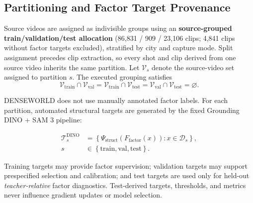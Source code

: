 \subsection{Partitioning and Factor Target Provenance}
\label{app:dataset_splits}

Source videos are assigned as indivisible groups using an
\textbf{source-grouped train/validation/test allocation} (86,831 / 909 / 23,106 clips; 4,841 clips without factor targets excluded), stratified by
city and capture mode. Split assignment precedes clip extraction, so
every shot and clip derived from one source video inherits the same
partition. Let \(\mathcal V_s\) denote the source-video set assigned to
partition \(s\). The executed grouping satisfies
\begin{equation*}
\mathcal V_{\mathrm{train}}\cap\mathcal V_{\mathrm{val}}
=
\mathcal V_{\mathrm{train}}\cap\mathcal V_{\mathrm{test}}
=
\mathcal V_{\mathrm{val}}\cap\mathcal V_{\mathrm{test}}
=
\varnothing.
\end{equation*}

DENSEWORLD does not use manually annotated factor labels. For each
partition, automated structural targets are generated by the fixed
Grounding DINO + SAM 3 pipeline:

\begin{equation*}
\begin{aligned}
\mathcal T_s^{\mathrm{DINO}}
&=
\left\{
\Psi_{\mathrm{struct}}
\!\left(
F_{\mathrm{factor}}(x)
\right)
:
x\in\mathcal D_s
\right\},
\\[-1pt]
s
&\in
\left\{
\mathrm{train},
\mathrm{val},
\mathrm{test}
\right\}.
\end{aligned}
\end{equation*}


Training targets may provide factor supervision; validation targets may
support prespecified selection and calibration; and test targets are
used only for held-out \emph{teacher-relative} factor diagnostics.
Test-derived targets, thresholds, and metrics never influence gradient
updates or model selection.

